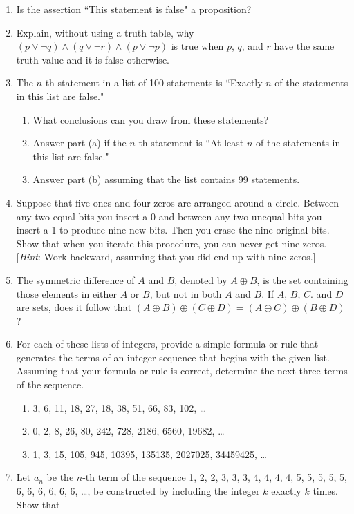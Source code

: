 \documentclass[letterpaper, 12pt]{article}
\begin{document}
\begin{enumerate}
    \item Is the assertion ``This statement is false" a proposition?
    \item Explain, without using a truth table, why $(p \vee \neg q) \wedge (q \vee \neg r) \wedge (p \vee \neg p)$ is true when $p$, $q$, and $r$ have the same truth value and it is false otherwise.
    \item The $n$-th statement in a list of 100 statements is ``Exactly $n$ of the statements in this list are false."
    \begin{enumerate}
        \item What conclusions can you draw from these statements?
        \item Answer part (a) if the $n$-th statement is ``At least $n$ of the statements in this list are false."
        \item Answer part (b) assuming that the list contains 99 statements.
    \end{enumerate}
    \item Suppose that five ones and four zeros are arranged around a circle. Between any two equal bits you insert a 0 and between any two unequal bits you insert a 1 to produce nine new bits. Then you erase the nine original bits. Show that when you iterate this procedure, you can never get nine zeros. [\textit{Hint}: Work backward, assuming that you did end up with nine zeros.]
    \item The symmetric difference of $A$ and $B$, denoted by $A \oplus B$, is the set containing those elements in either $A$ or $B$, but not in both $A$ and $B$. If $A$, $B$, $C$. and $D$ are sets, does it follow that $(A \oplus B) \oplus (C \oplus D) = (A \oplus C) \oplus (B \oplus D)$?
    \item For each of these lists of integers, provide a simple formula or rule that generates the terms of an integer sequence that begins with the given list. Assuming that your formula or rule is correct, determine the next three terms of the sequence.
    \begin{enumerate}
        \item 3, 6, 11, 18, 27, 18, 38, 51, 66, 83, 102, \ldots
        \item 0, 2, 8, 26, 80, 242, 728, 2186, 6560, 19682, \ldots
        \item 1, 3, 15, 105, 945, 10395, 135135, 2027025, 34459425, \ldots
    \end{enumerate}
    \item Let $a_n$ be the $n$-th term of the sequence 1, 2, 2, 3, 3, 3, 4, 4, 4, 4, 5, 5, 5, 5, 5, 6, 6, 6, 6, 6, 6, \ldots, be constructed by including the integer $k$ exactly $k$ times. Show that

\end{enumerate}
\end{document}
